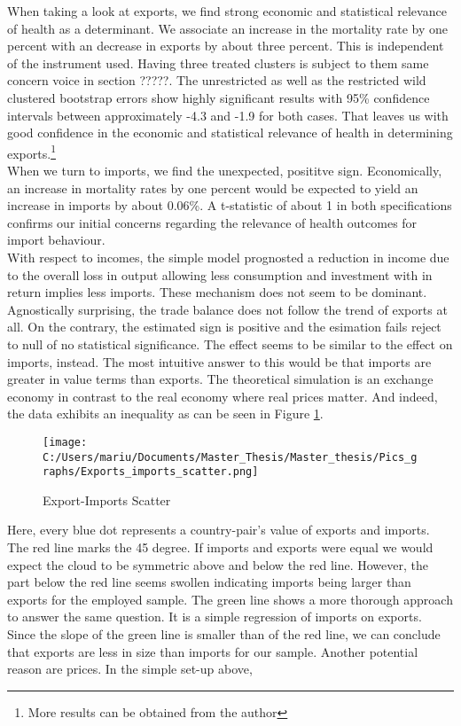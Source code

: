 \documentclass{article}
\begin{document}
When taking a look at exports, we find strong economic and statistical relevance of health as a determinant. We associate an increase in the mortality rate by one percent with an decrease in exports by about three percent. This is independent of the instrument used. Having three treated clusters is subject to them same concern voice in section ?????. The unrestricted as well as the restricted wild clustered bootstrap errors show highly significant results with 95\% confidence intervals between approximately -4.3 and -1.9 for both cases. That leaves us with good confidence in the economic and statistical relevance of health in determining exports.\footnote{More results can be obtained from the author}\\
When we turn to imports, we find the unexpected, posititve sign.  Economically, an increase in mortality rates by one percent would be expected to yield an increase in imports by about 0.06\%. A t-statistic of about 1 in both specifications confirms our initial concerns regarding the relevance of health outcomes for import behaviour. \\
With respect to incomes, the simple model prognosted a reduction in income due to the overall loss in output allowing less consumption and investment with in return implies less imports. These mechanism does not seem to be dominant. \\
Agnostically surprising, the trade balance does not follow the trend of exports at all. On the contrary, the estimated sign is positive and the esimation fails reject to null of no statistical significance. The effect seems to be similar to the effect on imports, instead. The most intuitive answer to this would be that imports are greater in value terms than exports. The theoretical simulation is an exchange economy in contrast to the real economy where real prices matter. And indeed, the data exhibits an inequality as can be seen in Figure \ref{Export-Imports Scatter}.

\begin{figure}[!ht]
\begin{center}\caption{Export-Imports Scatter \label{Export-Imports Scatter}}
\texttt{[image: C:/Users/mariu/Documents/Master\_Thesis/Master\_thesis/Pics\_graphs/Exports\_imports\_scatter.png]}\\
\end{center}
\end{figure}

Here, every blue dot represents a country-pair's value of exports and imports. The red line marks the 45 degree. If imports and exports were equal we would expect the cloud to be symmetric above and below the red line. However, the part below the red line seems swollen indicating imports being larger than exports for the employed sample. The green line shows a more thorough approach to answer the same question. It is a simple regression of imports on exports. Since the slope of the green line is smaller than of the red line, we can conclude that exports are less in size than imports for our sample. 
Another potential reason are prices. In the simple set-up above, \\
\end{document}
